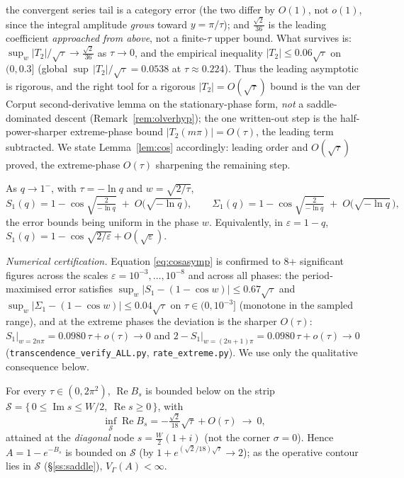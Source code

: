the convergent series tail is a category error \textup(the two differ by $O(1)$, not $o(1)$, since the
integral amplitude \emph{grows} toward $y=\pi/\tau$\textup); and $\tfrac{\sqrt2}{36}$ is the leading
coefficient \emph{approached from above}, not a finite-$\tau$ upper bound. What survives is:
$\sup_w|T_2|/\sqrt\tau\to\tfrac{\sqrt2}{36}$ as $\tau\to0$, and the empirical inequality
$|T_2|\le0.06\sqrt\tau$ on $(0,0.3]$ \textup(global $\sup\,|T_2|/\sqrt\tau=0.0538$ at $\tau\approx0.224$\textup).
Thus the leading asymptotic is rigorous, and the right tool for a rigorous $|T_2|=O(\sqrt\tau)$ bound is the
van der Corput second-derivative lemma on the stationary-phase form, \emph{not} a saddle-dominated descent
(Remark~\ref{rem:olverhyp}); the one written-out step is the half-power-sharper extreme-phase bound
$|T_2(m\pi)|=O(\tau)$, the leading term subtracted. We state Lemma~\ref{lem:cos} accordingly: leading order
and $O(\sqrt\tau)$ proved, the extreme-phase $O(\tau)$ sharpening the remaining step.

\begin{lemma}\label{lem:cos}
As $q\to1^{-}$, with $\tau=-\ln q$ and $w=\sqrt{2/\tau}$,
\begin{equation}\label{eq:cosasymp}
  S_1(q)=1-\cos\!\sqrt{\tfrac{2}{-\ln q}}\;+\;O\!\bigl(\sqrt{-\ln q}\,\bigr),
  \qquad
  \Sigma_1(q)=1-\cos\!\sqrt{\tfrac{2}{-\ln q}}\;+\;O\!\bigl(\sqrt{-\ln q}\,\bigr),
\end{equation}
the error bounds being uniform in the phase $w$. Equivalently, in $\varepsilon=1-q$,
$S_1(q)=1-\cos\sqrt{2/\varepsilon}+O(\sqrt{\varepsilon})$.
\end{lemma}

\noindent\emph{Numerical certification.} Equation \eqref{eq:cosasymp} is
confirmed to $8$+ significant figures across the scales
$\varepsilon=10^{-3},\dots,10^{-8}$ and across all phases: the period-maximised
error satisfies $\sup_w\lvert S_1-(1-\cos w)\rvert\le 0.67\sqrt{\tau}$ and
$\sup_w\lvert \Sigma_1-(1-\cos w)\rvert\le 0.04\sqrt{\tau}$ on $\tau\in(0,10^{-3}]$
(monotone in the sampled range), and at the extreme phases the deviation is the
sharper $O(\tau)$: $S_1\big|_{w=2n\pi}=0.0980\,\tau+o(\tau)\to0$ and
$2-S_1\big|_{w=(2n+1)\pi}=0.0980\,\tau+o(\tau)\to0$
(\texttt{transcendence\_verify\_ALL.py}, \texttt{rate\_extreme.py}). We use only
the qualitative consequence below.

\begin{lemma}\label{lem:Bbounded}
For every $\tau\in(0,2\pi^2)$, $\operatorname{Re}B_s$ is bounded below on the strip
$\mathcal S=\{\,0\le\operatorname{Im}s\le W/2,\ \operatorname{Re}s\ge0\,\}$, with
\[
   \inf_{\mathcal S}\operatorname{Re}B_s=-\tfrac{\sqrt2}{18}\sqrt\tau+O(\tau)\ \longrightarrow\ 0,
\]
attained at the \emph{diagonal} node $s=\tfrac W2(1+i)$ \textup(not the corner $\sigma=0$\textup). Hence
$A=1-e^{-B_s}$ is bounded on $\mathcal S$ \textup(by $1+e^{(\sqrt2/18)\sqrt\tau}\to2$\textup); as the
operative contour lies in $\mathcal S$ \textup(\S\ref{ss:saddle}\textup), $V_\Gamma(A)<\infty$.
\end{lemma}

